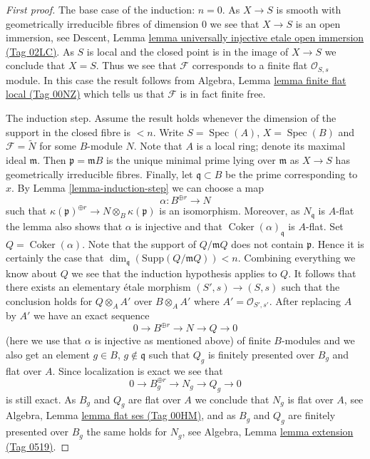 \documentclass{amsart}
\theoremstyle{plain}
\theoremstyle{definition}
\theoremstyle{remark}
\numberwithin{equation}{subsection}
\def\Spec{\mathop{\mathrm{Spec}}}
\def\Coker{\mathop{\mathrm{Coker}}}
\begin{document}
\begin{proof}[First proof]
\medskip\noindent
The base case of the induction: $n = 0$.
As $X \to S$ is smooth with geometrically
irreducible fibres of dimension $0$ we see that $X \to S$ is an open
immersion, see
Descent, Lemma \href{https://stacks.math.columbia.edu/tag/02LC}{lemma universally injective etale open immersion (Tag 02LC)}.
As $S$ is local and the closed point is in the image of $X \to S$
we conclude that $X = S$. Thus we see that $\mathcal{F}$ corresponds
to a finite flat $\mathcal{O}_{S, s}$ module. In this case the result
follows from
Algebra, Lemma \href{https://stacks.math.columbia.edu/tag/00NZ}{lemma finite flat local (Tag 00NZ)}
which tells us that $\mathcal{F}$ is in fact finite free.

\medskip\noindent
The induction step. Assume the result holds whenever the dimension
of the support in the closed fibre is $< n$. Write $S = \Spec(A)$,
$X = \Spec(B)$ and $\mathcal{F} = \widetilde{N}$ for some $B$-module
$N$. Note that $A$ is a local ring; denote its maximal ideal $\mathfrak m$.
Then $\mathfrak p = \mathfrak mB$ is the unique minimal prime lying over
$\mathfrak m$ as $X \to S$ has geometrically irreducible fibres. Finally,
let $\mathfrak q \subset B$ be the prime corresponding to $x$. By
Lemma \ref{lemma-induction-step}
we can choose a map
$$
\alpha : B^{\oplus r} \to N
$$
such that $\kappa(\mathfrak p)^{\oplus r} \to N \otimes_B \kappa(\mathfrak p)$
is an isomorphism. Moreover, as $N_{\mathfrak q}$ is $A$-flat the lemma
also shows that $\alpha$ is injective and that
$\Coker(\alpha)_{\mathfrak q}$ is $A$-flat.
Set $Q = \Coker(\alpha)$. Note that the support of $Q/\mathfrak mQ$
does not contain $\mathfrak p$. Hence it is certainly the case that
$\dim_{\mathfrak q}(\text{Supp}(Q/\mathfrak mQ)) < n$.
Combining everything we know about $Q$ we see
that the induction hypothesis applies to $Q$. It follows that there exists
an elementary \'etale morphism $(S', s) \to (S, s)$ such that the conclusion
holds for $Q \otimes_A A'$ over $B \otimes_A A'$ where
$A' = \mathcal{O}_{S', s'}$. After replacing $A$ by $A'$ we have an
exact sequence
$$
0 \to B^{\oplus r} \to N \to Q \to 0
$$
(here we use that $\alpha$ is injective as mentioned above)
of finite $B$-modules and we also get an element
$g \in B$, $g \not \in \mathfrak q$ such that
$Q_g$ is finitely presented over $B_g$ and flat over $A$. Since localization
is exact we see that
$$
0 \to B_g^{\oplus r} \to N_g \to Q_g \to 0
$$
is still exact. As $B_g$ and $Q_g$ are flat over $A$ we conclude that
$N_g$ is flat over $A$, see
Algebra, Lemma \href{https://stacks.math.columbia.edu/tag/00HM}{lemma flat ses (Tag 00HM)},
and as $B_g$ and $Q_g$ are finitely presented over $B_g$ the same holds
for $N_g$, see
Algebra, Lemma \href{https://stacks.math.columbia.edu/tag/0519}{lemma extension (Tag 0519)}.
\end{proof}
\end{document}
